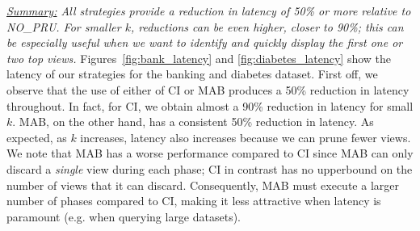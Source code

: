 

{\em \underline{Summary:} All strategies provide a reduction in latency of 50\% or more
relative to NO\_PRU. For smaller $k$, reductions can be even higher, closer to 90\%; this can be
especially useful when we want to identify and quickly display the first one or two top views.}
Figures~\ref{fig:bank_latency} and \ref{fig:diabetes_latency} show the latency
of our strategies for the banking and diabetes dataset.
First off, we observe that the use of either of CI or MAB produces a 50\% reduction in latency
throughout.
In fact, for CI, we obtain almost a 90\% reduction in latency for small $k$. 
MAB, on the other hand, has a consistent 50\% reduction in latency. 
As expected, as $k$ increases, latency also increases because we can prune fewer views.
We note that MAB has a worse performance compared to CI since MAB can only discard a 
{\it single} view during each phase; CI in contrast has no upperbound on the number of views that it
can discard.
Consequently, MAB must execute a larger number of phases compared to CI, making it less attractive
when latency is paramount (e.g. when querying large datasets).


